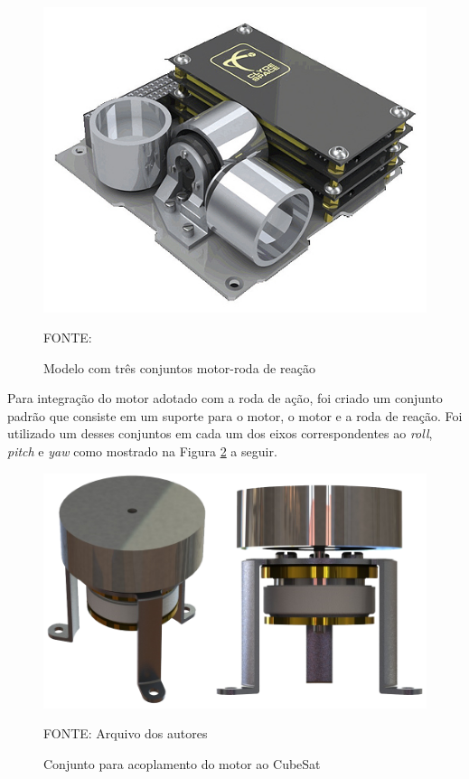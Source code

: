 \documentclass[
	12pt,				%
	openany,			%
	twoside,			%
	a4paper,			%
	english,			%
	french,				%
	spanish,			%
	brazil,				%
	oldfontcommands
	]{abntex2}
\begin{document}
\begin{figure}[th]
	\caption{Modelo com três conjuntos motor-roda de reação}
	\centering
	\includegraphics[width=0.7\linewidth]{./figs/3RW}
	
	\begin{small}
		FONTE: \cite{3RW}
	\end{small}
	\label{fig:3RW}
\end{figure}

\newpage

Para integração do motor adotado com a roda de ação, foi criado um conjunto padrão que consiste em um suporte para o motor, o motor e a roda de reação. Foi utilizado um desses conjuntos em cada um dos eixos correspondentes ao \textit{roll}, \textit{pitch} e \textit{yaw} como mostrado na Figura \ref{fig:MotSet} a seguir.

\begin{figure}[th]
	\caption{Conjunto para acoplamento do motor ao CubeSat}
	\centering
	\includegraphics[width=0.69\linewidth]{./figs/Motor_Set}
	
	\begin{small}
		FONTE: Arquivo dos autores
	\end{small}
	\label{fig:MotSet}
\end{figure}
\end{document}
